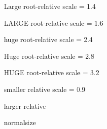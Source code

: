  { Large } { root-relative }
  {
    scale = 1.4
  }

 { LARGE } { root-relative }
  {
    scale = 1.6
  }

 { huge } { root-relative }
  {
    scale = 2.4
  }

 { Huge } { root-relative }
  {
    scale = 2.8
  }

 { HUGE } { root-relative }
  {
    scale = 3.2
  }

 { smaller } { relative }
  {
    scale = 0.9
  }

 { larger } { relative }
  {
  
  }



%

\RenewDocumentCommand \normalsize { }
  {  { normalsize } }
